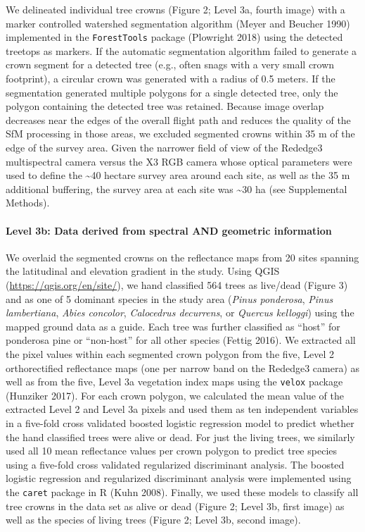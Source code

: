 \documentclass[]{article}
\let\oldparagraph\paragraph
\renewcommand{\paragraph}[1]{\oldparagraph{#1}\mbox{}}
\begin{document}
We delineated individual tree crowns (Figure 2; Level 3a, fourth image)
with a marker controlled watershed segmentation algorithm (Meyer and
Beucher 1990) implemented in the \texttt{ForestTools} package (Plowright
2018) using the detected treetops as markers. If the automatic
segmentation algorithm failed to generate a crown segment for a detected
tree (e.g., often snags with a very small crown footprint), a circular
crown was generated with a radius of 0.5 meters. If the segmentation
generated multiple polygons for a single detected tree, only the polygon
containing the detected tree was retained. Because image overlap
decreases near the edges of the overall flight path and reduces the
quality of the SfM processing in those areas, we excluded segmented
crowns within 35 m of the edge of the survey area. Given the narrower
field of view of the Rededge3 multispectral camera versus the X3 RGB
camera whose optical parameters were used to define the
\textasciitilde{}40 hectare survey area around each site, as well as the
35 m additional buffering, the survey area at each site was
\textasciitilde{}30 ha (see Supplemental Methods).

\hypertarget{level-3b-data-derived-from-spectral-and-geometric-information}{%
\paragraph{Level 3b: Data derived from spectral AND geometric
information}\label{level-3b-data-derived-from-spectral-and-geometric-information}}

We overlaid the segmented crowns on the reflectance maps from 20 sites
spanning the latitudinal and elevation gradient in the study. Using QGIS
(\url{https://qgis.org/en/site/}), we hand classified 564 trees as
live/dead (Figure 3) and as one of 5 dominant species in the study area
(\emph{Pinus ponderosa}, \emph{Pinus lambertiana}, \emph{Abies
concolor}, \emph{Calocedrus decurrens}, or \emph{Quercus kelloggi})
using the mapped ground data as a guide. Each tree was further
classified as ``host'' for ponderosa pine or ``non-host'' for all other
species (Fettig 2016). We extracted all the pixel values within each
segmented crown polygon from the five, Level 2 orthorectified
reflectance maps (one per narrow band on the Rededge3 camera) as well as
from the five, Level 3a vegetation index maps using the \texttt{velox}
package (Hunziker 2017). For each crown polygon, we calculated the mean
value of the extracted Level 2 and Level 3a pixels and used them as ten
independent variables in a five-fold cross validated boosted logistic
regression model to predict whether the hand classified trees were alive
or dead. For just the living trees, we similarly used all 10 mean
reflectance values per crown polygon to predict tree species using a
five-fold cross validated regularized discriminant analysis. The boosted
logistic regression and regularized discriminant analysis were
implemented using the \texttt{caret} package in R (Kuhn 2008). Finally,
we used these models to classify all tree crowns in the data set as
alive or dead (Figure 2; Level 3b, first image) as well as the species
of living trees (Figure 2; Level 3b, second image).
\end{document}
